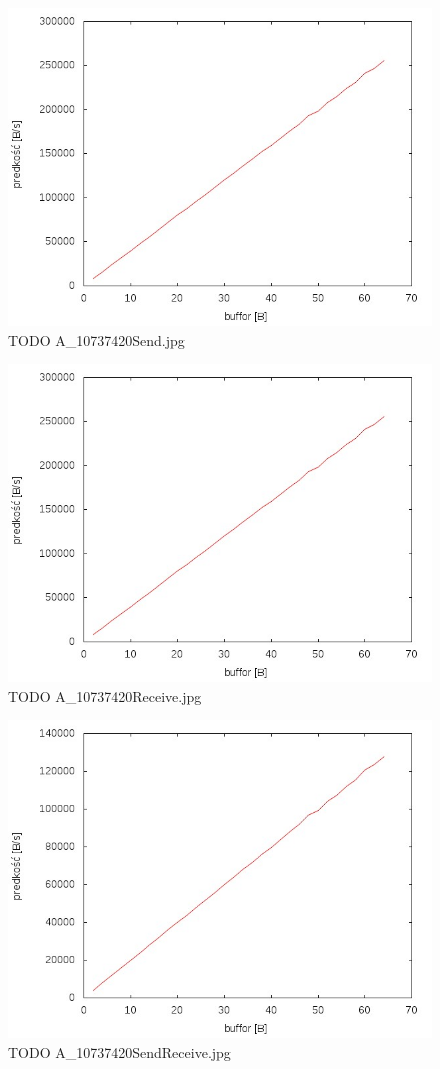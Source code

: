 \documentclass{BscUS}
\begin{document}
\begin{figure}[h]
\centering
\includegraphics{./img/A_10737420Send}
\caption{TODO A\_10737420Send.jpg}
\end{figure}

\begin{figure}[h]
\centering
\includegraphics{./img/A_10737420Receive}
\caption{TODO A\_10737420Receive.jpg}
\end{figure}

\begin{figure}[h]
\centering
\includegraphics{./img/A_10737420SendReceive}
\caption{TODO A\_10737420SendReceive.jpg}
\end{figure}

\end{document}
